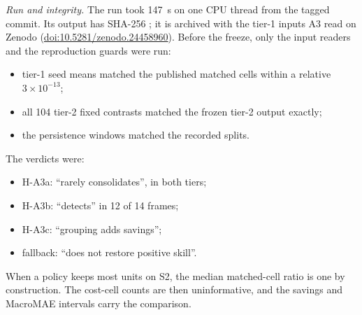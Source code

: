 \documentclass[a4paper,11pt]{article}
\begin{document}
\emph{Run and integrity.} The run took 147~s on one CPU thread from the tagged commit. Its output has SHA-256
\texttt{}; it is archived with the tier-1
inputs A3 read on Zenodo (\href{https://doi.org/10.5281/zenodo.24458960}{doi:10.5281/zenodo.24458960}). Before the freeze, only the
input readers and the reproduction guards were run:
\begin{itemize}
  \item tier-1 seed means matched the published matched cells within a relative $3\times10^{-13}$;
  \item all 104 tier-2 fixed contrasts matched the frozen tier-2 output exactly;
  \item the persistence windows matched the recorded splits.
\end{itemize}
The verdicts were:
\begin{itemize}
  \item H-A3a: ``rarely consolidates'', in both tiers;
  \item H-A3b: ``detects'' in 12 of 14 frames;
  \item H-A3c: ``grouping adds savings'';
  \item fallback: ``does not restore positive skill''.
\end{itemize}
When a policy keeps most units on S2, the median matched-cell ratio is one by construction. The cost-cell counts
are then uninformative, and the savings and MacroMAE intervals carry the comparison.







\end{document}

